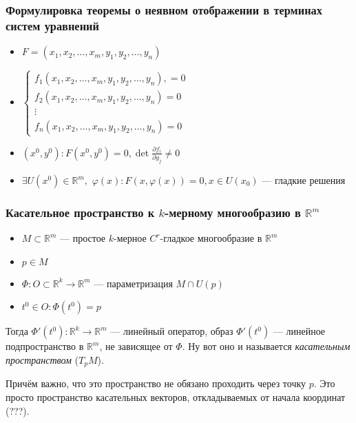 \documentclass{article}
\def\dbl{\,\,}
\begin{document}
\subsubsection{Формулировка теоремы о неявном отображении в терминах систем уравнений}
\begin{itemize}
    \item $F = (x_1, x_2, \ldots, x_m, y_1, y_2, \ldots, y_n)$
    \item $\begin{cases}
        f_1(x_1, x_2, \ldots, x_m, y_1, y_2, \ldots, y_n) ,= 0\\
        f_2(x_1, x_2, \ldots, x_m, y_1, y_2, \ldots, y_n) = 0\\
        \vdots\\
        f_n(x_1, x_2, \ldots, x_m, y_1, y_2, \ldots, y_n) = 0
    \end{cases}$
    \item $(x^0, y^0): F(x^0, y^0) = 0, \det \frac{\partial f_i}{\partial y_j} \neq 0$
    \item $\exists U(x^0) \in \mathbb{R}^m, \dbl \varphi(x): F(x, \varphi(x)) = 0, x \in U(x_0)$ --- гладкие решения
\end{itemize}

\subsubsection{Касательное пространство к $k$-мерному многообразию в $\mathbb{R}^m$}

\begin{itemize}
    \item $M \subset \mathbb{R}^m$ --- простое $k$-мерное $C^r$-гладкое многообразие в $\mathbb{R}^m$
    \item $p \in M$
    \item $\Phi: O \subset \mathbb{R}^k \rightarrow \mathbb{R}^m$ --- параметризация $M \cap U(p)$
    \item $t^0 \in O: \Phi(t^0) = p$
\end{itemize}

Тогда $\Phi'(t^0): \mathbb{R}^k \rightarrow \mathbb{R}^m$ --- линейный оператор, образ $\Phi'(t^0)$ --- линейное подпространство в $\mathbb{R}^m$, не зависящее от $\Phi$. Ну вот оно и называется \textit{касательным пространством} ($T_p M$).

Причём важно, что это пространство не обязано проходить через точку $p$. Это просто пространство касательных векторов, откладываемых от начала координат (???). 
\end{document}
